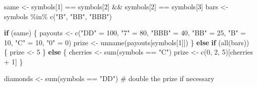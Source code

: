 \documentclass[
  letterpaper,
  DIV=11,
  numbers=noendperiod]{scrbook}
\newenvironment{Shaded}{\begin{snugshade}}{\end{snugshade}}
\newcommand{\CommentTok}[1]{\textcolor[rgb]{0.37,0.37,0.37}{#1}}
\newcommand{\ControlFlowTok}[1]{\textcolor[rgb]{0.00,0.23,0.31}{\textbf{#1}}}
\newcommand{\DecValTok}[1]{\textcolor[rgb]{0.68,0.00,0.00}{#1}}
\newcommand{\FunctionTok}[1]{\textcolor[rgb]{0.28,0.35,0.67}{#1}}
\newcommand{\NormalTok}[1]{\textcolor[rgb]{0.00,0.23,0.31}{#1}}
\newcommand{\OtherTok}[1]{\textcolor[rgb]{0.00,0.23,0.31}{#1}}
\newcommand{\SpecialCharTok}[1]{\textcolor[rgb]{0.37,0.37,0.37}{#1}}
\newcommand{\StringTok}[1]{\textcolor[rgb]{0.13,0.47,0.30}{#1}}
\begin{document}
\begin{Shaded}
\begin{Highlighting}[]
\NormalTok{same }\OtherTok{\textless{}{-}}\NormalTok{ symbols[}\DecValTok{1}\NormalTok{] }\SpecialCharTok{==}\NormalTok{ symbols[}\DecValTok{2}\NormalTok{] }\SpecialCharTok{\&\&}\NormalTok{ symbols[}\DecValTok{2}\NormalTok{] }\SpecialCharTok{==}\NormalTok{ symbols[}\DecValTok{3}\NormalTok{]}
\NormalTok{bars }\OtherTok{\textless{}{-}}\NormalTok{ symbols }\SpecialCharTok{\%in\%} \FunctionTok{c}\NormalTok{(}\StringTok{"B"}\NormalTok{, }\StringTok{"BB"}\NormalTok{, }\StringTok{"BBB"}\NormalTok{)}

\ControlFlowTok{if}\NormalTok{ (same) \{}
\NormalTok{  payouts }\OtherTok{\textless{}{-}} \FunctionTok{c}\NormalTok{(}\StringTok{"DD"} \OtherTok{=} \DecValTok{100}\NormalTok{, }\StringTok{"7"} \OtherTok{=} \DecValTok{80}\NormalTok{, }\StringTok{"BBB"} \OtherTok{=} \DecValTok{40}\NormalTok{, }\StringTok{"BB"} \OtherTok{=} \DecValTok{25}\NormalTok{, }
    \StringTok{"B"} \OtherTok{=} \DecValTok{10}\NormalTok{, }\StringTok{"C"} \OtherTok{=} \DecValTok{10}\NormalTok{, }\StringTok{"0"} \OtherTok{=} \DecValTok{0}\NormalTok{)}
\NormalTok{  prize }\OtherTok{\textless{}{-}} \FunctionTok{unname}\NormalTok{(payouts[symbols[}\DecValTok{1}\NormalTok{]])}
\NormalTok{\} }\ControlFlowTok{else} \ControlFlowTok{if}\NormalTok{ (}\FunctionTok{all}\NormalTok{(bars)) \{}
\NormalTok{  prize }\OtherTok{\textless{}{-}} \DecValTok{5}
\NormalTok{\} }\ControlFlowTok{else}\NormalTok{ \{}
\NormalTok{  cherries }\OtherTok{\textless{}{-}} \FunctionTok{sum}\NormalTok{(symbols }\SpecialCharTok{==} \StringTok{"C"}\NormalTok{)}
\NormalTok{  prize }\OtherTok{\textless{}{-}} \FunctionTok{c}\NormalTok{(}\DecValTok{0}\NormalTok{, }\DecValTok{2}\NormalTok{, }\DecValTok{5}\NormalTok{)[cherries }\SpecialCharTok{+} \DecValTok{1}\NormalTok{]}
\NormalTok{\}}

\NormalTok{diamonds }\OtherTok{\textless{}{-}} \FunctionTok{sum}\NormalTok{(symbols }\SpecialCharTok{==} \StringTok{"DD"}\NormalTok{)}
\CommentTok{\# double the prize if necessary}
\end{Highlighting}
\end{Shaded}
\end{document}
